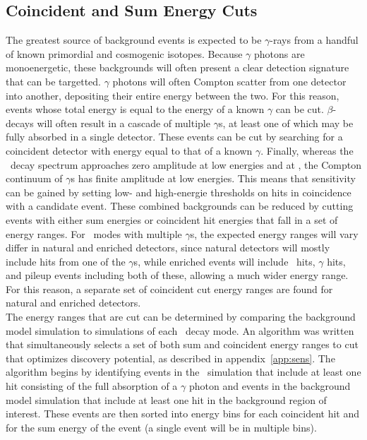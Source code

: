 \documentclass[/main.tex]{subfiles}
\begin{document}
\subsection{Coincident and Sum Energy Cuts} \label{sec:MSenergycuts}
The greatest source of background events is expected to be $\gamma$-rays from a handful of known primordial and cosmogenic isotopes.
Because $\gamma$ photons are monoenergetic, these backgrounds will often present a clear detection signature that can be targetted.
$\gamma$ photons will often Compton scatter from one detector into another, depositing their entire energy between the two.
For this reason, events whose total energy is equal to the energy of a known $\gamma$ can be cut.
$\beta$-decays will often result in a cascade of multiple $\gamma$s, at least one of which may be fully absorbed in a single detector.
These events can be cut by searching for a coincident detector with energy equal to that of a known $\gamma$.
Finally, whereas the \bb\ decay spectrum approaches zero amplitude at low energies and at \Qbb, the Compton continuum of $\gamma$s has finite amplitude at low energies.
This means that sensitivity can be gained by setting low- and high-energie thresholds on hits in coincidence with a candidate event.
These combined backgrounds can be reduced by cutting events with either sum energies or coincident hit energies that fall in a set of energy ranges.
For \bbes\ modes with multiple $\gamma$s, the expected energy ranges will vary differ in natural and enriched detectors, since natural detectors will mostly include hits from one of the $\gamma$s, while enriched events will include \bb\ hits, $\gamma$ hits, and pileup events including both of these, allowing a much wider energy range.
For this reason, a separate set of coincident cut energy ranges are found for natural and enriched detectors.
\\
The energy ranges that are cut can be determined by comparing the background model simulation to simulations of each \bbes\ decay mode.
An algorithm was written that simultaneously selects a set of both sum and coincident energy ranges to cut that optimizes discovery potential, as described in appendix~\ref{app:sens}.
The algorithm begins by identifying events in the \bbes\ simulation that include at least one hit consisting of the full absorption of a $\gamma$ photon and events in the background model simulation that include at least one hit in the background region of interest.
These events are then sorted into energy bins for each coincident hit and for the sum energy of the event (a single event will be in multiple bins).
\end{document}
